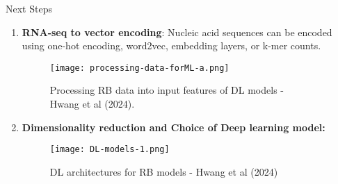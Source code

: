\documentclass[final]{beamer}
\newlength{\sepwidth}
\newlength{\colwidth}
\newcommand{\separatorcolumn}{\begin{column}{\sepwidth}\end{column}}
\begin{document}
\begin{frame}[t]
\begin{columns}[t]
\separatorcolumn

\begin{column}{\colwidth}



    \begin{block}{Next Steps}


    \begin{enumerate}
        \item \textbf{RNA-seq to vector encoding}: Nucleic acid sequences can be encoded using one-hot encoding, word2vec, embedding layers, or k-mer counts.

    \begin{figure}
        \centering
        \texttt{[image: processing-data-forML-a.png]}
        \caption{Processing RB data into input features of DL models - Hwang et al (2024). }
        \label{fig:processing-data-nucleic-acid}
    \end{figure}

        \item \textbf{Dimensionality reduction and Choice of Deep learning model:}
  

\begin{figure}
    \centering
    \texttt{[image: DL-models-1.png]}
    \caption{DL architectures for RB models - Hwang et al (2024)}
    \label{fig:DL-architectures}
\end{figure}


\end{enumerate}
\end{block}
\end{column}
\end{columns}
\end{frame}
\end{document}
